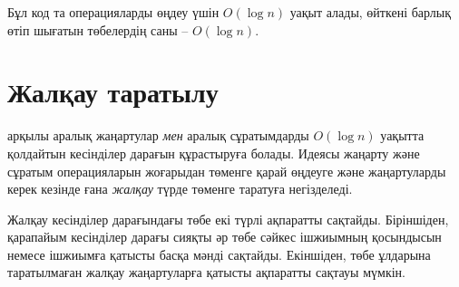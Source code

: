 \begin{center}
\end{center}

Бұл код та операцияларды өңдеу үшін
$O(\log n)$ уақыт алады, өйткені барлық өтіп шығатын 
төбелердің саны -- $O(\log n)$.

\section{Жалқау таратылу}


 арқылы аралық жаңартулар \emph{мен}
аралық сұратымдарды $O(\log n)$ уақытта қолдайтын кесінділер
дарағын құрастыруға болады. Идеясы жаңарту және сұратым 
операцияларын жоғарыдан төменге қарай өңдеуге және жаңартуларды
керек кезінде ғана \emph{жалқау} түрде төменге таратуға негізделеді.



Жалқау кесінділер дарағындағы төбе екі түрлі ақпаратты
сақтайды. Біріншіден, қарапайым кесінділер дарағы сияқты
әр төбе сәйкес ішжиымның 
қосындысын немесе ішжиымға қатысты басқа мәнді сақтайды.
Екіншіден, төбе ұлдарына таратылмаған жалқау жаңартуларға қатысты 
ақпаратты сақтауы мүмкін.

